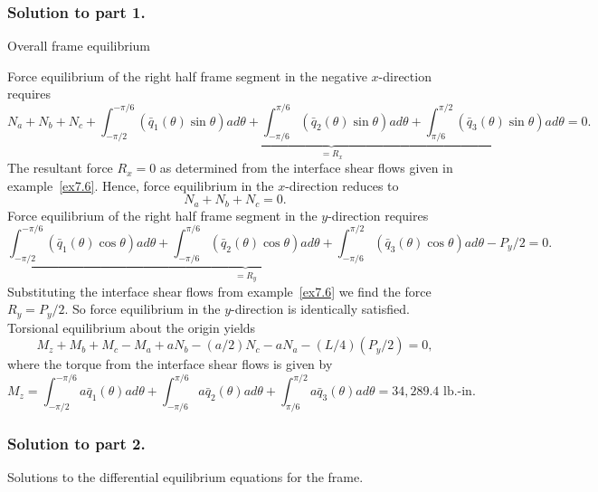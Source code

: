 \documentclass{AeroStructure-ERJohnson}
\begin{document}
\begin{example}
\subsubsection{Solution to part 1.} Overall frame equilibrium

Force equilibrium of the right half frame segment in the negative $x$-direction requires
\begin{equation}
N_{a}+N_{b}+N_{c}+ \underbrace{\int_{-\pi / 2}^{-\pi / 6}\left(\bar{q}_{1}(\theta) \sin \theta\right) a d \theta+\int_{-\pi/6}^{\pi/6}\left(\bar{q}_{2}(\theta) \sin \theta\right) a d \theta+\int_{\pi/6}^{\pi/2}\left(\bar{q}_{3}(\theta) \sin \theta\right) a d \theta}_{=R_x} =0. \label{eq7.7.a}\tag{a}
\end{equation}
The resultant force $R_{x}=0$ as determined from the interface shear flows given in example~\ref{ex7.6}. Hence, force equilibrium in the $x$-direction reduces to
\begin{equation}
N_{a}+N_{b}+N_{c}=0. \label{eq7.7.b}\tag{b}
\end{equation}
Force equilibrium of the right half frame segment in the $y$-direction requires
\begin{equation}
\underbrace{\int_{-\pi / 2}^{-\pi / 6}\left(\bar{q}_{1}(\theta) \cos \theta\right) a d \theta+\int_{-\pi/6}^{\pi/6}\left(\bar{q}_{2}(\theta) \cos \theta\right) a d \theta+\int_{-\pi/6}^{\pi/2}\left(\bar{q}_{3}(\theta) \cos \theta\right) a d \theta}_{=R_y}- P_y /2=0. \label{eq7.7.c}\tag{c}
\end{equation}
Substituting the interface shear flows from example~\ref{ex7.6} we find the force $R_{y}=P_{y} / 2$. So force equilibrium in the $y$-direction is identically satisfied. Torsional equilibrium about the origin yields
\begin{equation}
M_{z}+M_{b}+M_{c}-M_{a}+a N_{b}-(a / 2) N_{c}-a N_{a}-(L / 4)\left(P_{y} / 2\right)=0, \label{eq7.7.d}\tag{d}
\end{equation}
where the torque from the interface shear flows is given by
\begin{equation}
M_{z}=\int_{-\pi / 2}^{-\pi / 6} a \bar{q}_{1}(\theta) a d \theta+\int_{-\pi / 6}^{\pi / 6} a \bar{q}_{2}(\theta) a d \theta+\int_{\pi / 6}^{\pi / 2} a \bar{q}_{3}(\theta) a d \theta=34{,}289.4 \text { lb.-in. }\label{eq7.7.e}\tag{e}
\end{equation}

\subsubsection{Solution to part 2.} Solutions to the differential equilibrium equations for the frame.


\end{example}
\end{document}
